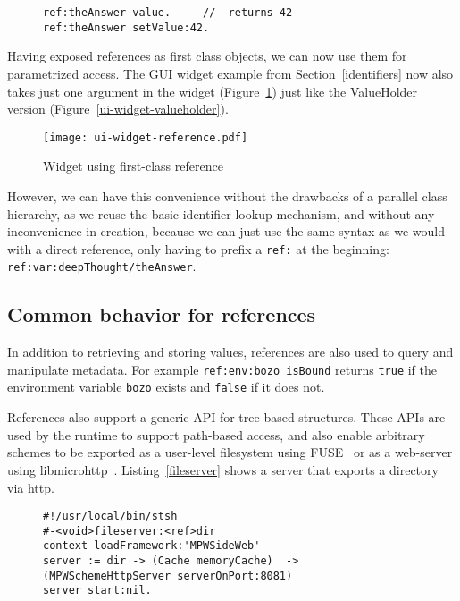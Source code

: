 \documentclass[preprint]{sigplanconf}
\begin{document}
\begin{figure}[htbp]
\begin{lstlisting}[style=numbers,label=ref-binding,caption=Retrieve and store value via its reference.]
ref:theAnswer value.     //  returns 42
ref:theAnswer setValue:42.  
\end{lstlisting}
\end{figure}

Having exposed references as first class objects, we can now use them for parametrized 
access.  The GUI widget example from Section~\ref{identifiers} now
also takes just one argument in the widget (Figure~\ref{ui-widget-reference}) just like
the ValueHolder version (Figure~\ref{ui-widget-valueholder}).

\begin{figure}[htbp]
\centering
\texttt{[image: ui-widget-reference.pdf]}
\caption{Widget using first-class reference}
\label{ui-widget-reference}

\end{figure}

However, we can have this convenience without the drawbacks of a parallel class
hierarchy, as we reuse the basic identifier lookup mechanism, and without any
inconvenience in creation, because we can just use the same syntax as we would
with a direct reference, only having to prefix a {\tt ref:} at the beginning:  {\tt ref:var:deepThought/theAnswer}.


\subsection{Common behavior for references}
\label{common-reference-behavior}
In addition to retrieving and storing values, references are also used to query and manipulate
metadata.  For example {\tt ref:env:bozo isBound} returns {\tt true} if the environment
variable {\tt bozo} exists and {\tt false} if it does not.

References also support a generic API for tree-based structures.   These APIs are used
by the runtime to support path-based access, and also enable arbitrary
schemes to be exported as a user-level filesystem using FUSE~\cite{fuse} or as a web-server using libmicrohttp~\cite{libmicrohttp}.
Listing~\ref{fileserver} shows a server that exports a directory via http.

\vspace{-1.0em}
\begin{figure}[htbp]
\begin{lstlisting}[style=numbers,label=fileserver,caption=Exporting a directory via http.]
#!/usr/local/bin/stsh
#-<void>fileserver:<ref>dir
context loadFramework:'MPWSideWeb'
server := dir -> (Cache memoryCache)  ->  (MPWSchemeHttpServer serverOnPort:8081)
server start:nil.
\end{lstlisting}
\end{figure}
\end{document}
